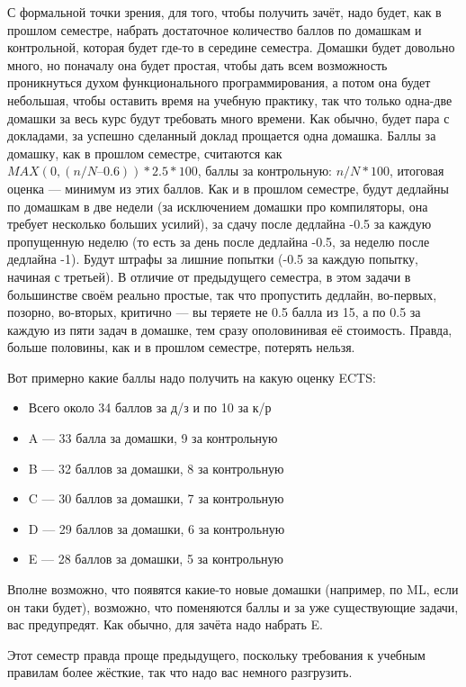 \documentclass[a5paper]{article}
\begin{document}
С формальной точки зрения, для того, чтобы получить зачёт, надо будет, как в прошлом семестре, набрать достаточное количество баллов по домашкам и контрольной, которая будет где-то в середине семестра. Домашки будет довольно много, но поначалу она будет простая, чтобы дать всем возможность проникнуться духом функционального программирования, а потом она будет небольшая, чтобы оставить время на учебную практику, так что только одна-две домашки за весь курс будут требовать много времени. Как обычно, будет пара с докладами, за успешно сделанный доклад прощается одна домашка. Баллы за домашку, как в прошлом семестре, считаются как $MAX(0, (n/N – 0.6)) * 2.5 * 100$, баллы за контрольную: $n/N * 100$, итоговая оценка --- минимум из этих баллов. Как и в прошлом семестре, будут дедлайны по домашкам в две недели (за исключением домашки про компиляторы, она требует несколько больших усилий), за сдачу после дедлайна -0.5 за каждую пропущенную неделю (то есть за день после дедлайна -0.5, за неделю после дедлайна -1). Будут штрафы за лишние попытки (-0.5 за каждую попытку, начиная с третьей). В отличие от предыдущего семестра, в этом задачи в большинстве своём реально простые, так что пропустить дедлайн, во-первых, позорно, во-вторых, критично --- вы теряете не 0.5 балла из 15, а по 0.5 за каждую из пяти задач в домашке, тем сразу ополовинивая её стоимость. Правда, больше половины, как и в прошлом семестре, потерять нельзя.

Вот примерно какие баллы надо получить на какую оценку ECTS:
\begin{itemize}
    \item Всего около 34 баллов за д/з и по 10 за к/р
    \item A --- 33 балла за домашки, 9 за контрольную
    \item B --- 32 баллов за домашки, 8 за контрольную
    \item C --- 30 баллов за домашки, 7 за контрольную
    \item D --- 29 баллов за домашки, 6 за контрольную
    \item E --- 28 баллов за домашки, 5 за контрольную
\end{itemize}

Вполне возможно, что появятся какие-то новые домашки (например, по ML, если он таки будет), возможно, что поменяются баллы и за уже существующие задачи, вас предупредят. Как обычно, для зачёта надо набрать E. 

Этот семестр правда проще предыдущего, поскольку требования к учебным правилам более жёсткие, так что надо вас немного разгрузить.
\end{document}
